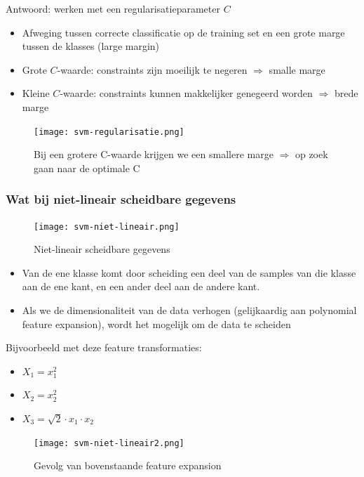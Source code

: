 \documentclass{article}
\begin{document}
Antwoord: werken met een regularisatieparameter $C$

\begin{itemize}
    \item Afweging tussen correcte classificatie op de training set en een grote marge tussen de klasses (large margin)
    \item Grote $C$-waarde: constraints zijn moeilijk te negeren $\Rightarrow$ smalle marge
    \item Kleine $C$-waarde: constraints kunnen makkelijker genegeerd worden $\Rightarrow$ brede marge
\end{itemize}

\begin{figure}[H]
    \centering
    \texttt{[image: svm-regularisatie.png]}
    \caption{Bij een grotere C-waarde krijgen we een smallere marge $\Rightarrow$ op zoek gaan naar de optimale C}
\end{figure}

\subsubsection{Wat bij niet-lineair scheidbare gegevens}

\begin{figure}[H]
    \centering
    \texttt{[image: svm-niet-lineair.png]}
    \caption{Niet-lineair scheidbare gegevens}
\end{figure}

\begin{itemize}
    \item Van de ene klasse komt door scheiding een deel van de samples van die klasse aan de ene kant, en een ander deel aan de andere kant.
    \item Als we de dimensionaliteit van de data verhogen (gelijkaardig aan polynomial feature expansion), wordt het mogelijk om de data te scheiden
\end{itemize}

Bijvoorbeeld met deze feature transformaties:

\begin{itemize}
    \item $X_1 = x_1^2$
    \item $X_2 = x_2^2$
    \item $X_3= \sqrt{2}\cdot x_1 \cdot x_2$
\end{itemize}

\begin{figure}[H]
    \centering
    \texttt{[image: svm-niet-lineair2.png]}
    \caption{Gevolg van bovenstaande feature expansion}
\end{figure}
\end{document}
